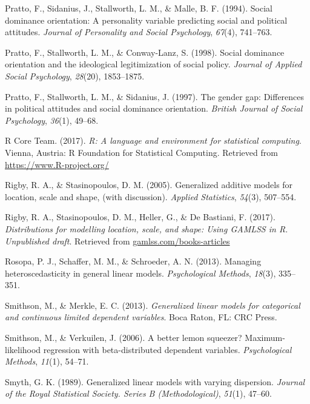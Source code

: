 \documentclass[english,man]{apa6}
\theoremstyle{definition}
\theoremstyle{definition}
\theoremstyle{remark}
\begin{document}
\hypertarget{ref-pratto1994social}{}
Pratto, F., Sidanius, J., Stallworth, L. M., \& Malle, B. F. (1994).
Social dominance orientation: A personality variable predicting social
and political attitudes. \emph{Journal of Personality and Social
Psychology}, \emph{67}(4), 741--763.

\hypertarget{ref-pratto1998social}{}
Pratto, F., Stallworth, L. M., \& Conway-Lanz, S. (1998). Social
dominance orientation and the ideological legitimization of social
policy. \emph{Journal of Applied Social Psychology}, \emph{28}(20),
1853--1875.

\hypertarget{ref-pratto1997gender}{}
Pratto, F., Stallworth, L. M., \& Sidanius, J. (1997). The gender gap:
Differences in political attitudes and social dominance orientation.
\emph{British Journal of Social Psychology}, \emph{36}(1), 49--68.

\hypertarget{ref-rcore2017}{}
R Core Team. (2017). \emph{R: A language and environment for statistical
computing}. Vienna, Austria: R Foundation for Statistical Computing.
Retrieved from \url{https://www.R-project.org/}

\hypertarget{ref-rigby2005generalized}{}
Rigby, R. A., \& Stasinopoulos, D. M. (2005). Generalized additive
models for location, scale and shape, (with discussion). \emph{Applied
Statistics}, \emph{54}(3), 507--554.

\hypertarget{ref-rigby2017distributions}{}
Rigby, R. A., Stasinopoulos, D. M., Heller, G., \& De Bastiani, F.
(2017). \emph{Distributions for modelling location, scale, and shape:
Using GAMLSS in R. Unpublished draft}. Retrieved from
\url{gamlss.com/books-articles}

\hypertarget{ref-rosopa2013managing}{}
Rosopa, P. J., Schaffer, M. M., \& Schroeder, A. N. (2013). Managing
heteroscedasticity in general linear models. \emph{Psychological
Methods}, \emph{18}(3), 335--351.

\hypertarget{ref-smithson2013generalized}{}
Smithson, M., \& Merkle, E. C. (2013). \emph{Generalized linear models
for categorical and continuous limited dependent variables}. Boca Raton,
FL: CRC Press.

\hypertarget{ref-smithson2006better}{}
Smithson, M., \& Verkuilen, J. (2006). A better lemon squeezer?
Maximum-likelihood regression with beta-distributed dependent variables.
\emph{Psychological Methods}, \emph{11}(1), 54--71.

\hypertarget{ref-smyth1989generalized}{}
Smyth, G. K. (1989). Generalized linear models with varying dispersion.
\emph{Journal of the Royal Statistical Society. Series B
(Methodological)}, \emph{51}(1), 47--60.
\end{document}
